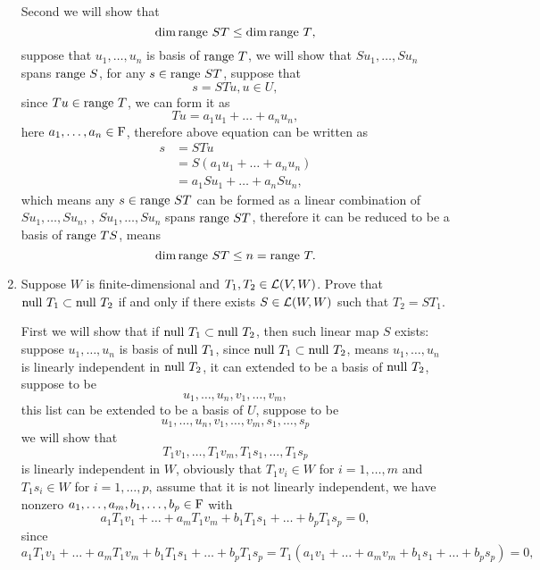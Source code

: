 \begin{enumerate}
\begin{solution}
            Second we will show that 
            \[ \dim{\text{range}~ST} \leq \dim{\text{range}~T} ,\]
            suppose that $u_1, \ldots, u_n$ is basis of $\text{range}~T$, we will show that $Su_1, \ldots, Su_n$ spans $\text{range}~S$, for 
            any $s \in \text{range}~ST$, suppose that 
            \[ s = STu, u \in U ,\]
            since $Tu \in \text{range}~T$, we can form it as 
            \[ Tu = a_1u_1 + \dots + a_nu_n, \]
            here $a_1, \ldots, a_n \in \mathrm{F}$, therefore above equation can be written as 
            \begin{align*}
                s &= STu \\
                  &= S(a_1u_1 + \dots + a_nu_n) \\
                  &= a_1Su_1 + \dots + a_nSu_n,
            \end{align*}
            which means any $s \in \text{range}~ST$ can be formed as a linear combination of $Su_1, \ldots, Su_n$, \ie, $Su_1, \ldots, Su_n$ spans 
            $\text{range}~ST$, therefore it can be reduced to be a basis of $\text{range}~TS$, means 
            \[ \dim{\text{range}~ST} \leq n = \text{range}~T .\]
        \end{solution}
    \item Suppose $W$ is finite-dimensional and $T_1, T_2 \in \mathcal{L}(V, W)$. Prove that $\text{null}~T_1 \subset \text{null}~T_2$ if and only if there exists 
        $S \in \mathcal{L}(W, W)$ such that $T_2 = ST_1$.
        \begin{solution}
            First we will show that if $\text{null}~T_1 \subset \text{null}~T_2$, then such linear map $S$ exists:
            suppose $u_1, \ldots, u_n$ is basis of $\text{null}~T_1$, since $\text{null}~T_1 \subset \text{null}~T_2$, means $u_1, \ldots, u_n$ is 
            linearly independent in $\text{null}~T_2$, it can extended to be a basis of $\text{null}~T_2$, suppose to be 
            \[ u_1, \ldots, u_n, v_1, \ldots, v_m, \]
            this list can be extended to be a basis of $U$, suppose to be 
            \[ u_1, \ldots, u_n, v_1, \ldots, v_m, s_1,\ldots, s_p \]
            we will show that 
            \[ T_1v_1, \ldots, T_1v_m, T_1s_1, \ldots, T_1s_p  \]
            is linearly independent in $W$, obviously that $T_1v_i \in W$ for $i = 1, \ldots, m$ and $T_1s_i \in W$ for $i = 1,\ldots, p$,
            assume that it is not linearly independent, 
            we have nonzero $a_1, \ldots, a_m, b_1, \ldots, b_p \in \mathrm{F}$ with 
            \[ a_1T_1v_1 + \dots + a_mT_1v_m  + b_1T_1s_1 + \dots + b_pT_1s_p = 0, \]
            since 
            \[ a_1T_1v_1 + \dots + a_mT_1v_m + b_1T_1s_1 + \dots + b_pT_1s_p = T_1(a_1v_1 + \dots + a_mv_m + b_1s_1 + \dots + b_ps_p) = 0, \]

\end{solution}
\end{enumerate}
